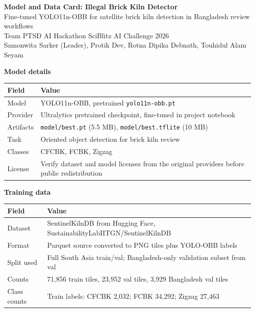\documentclass[9pt]{article}
\begin{document}
\fontsize{8.25}{9.25}\selectfont
\begin{center}
{\large \textbf{Model and Data Card: Illegal Brick Kiln Detector}}\\[-0.2em]
{\small Fine-tuned YOLO11n-OBB for satellite brick kiln detection in Bangladesh review workflows}\\
{\small Team PTSD \textbar{} AI Hackathon SciBlitz AI Challenge 2026}\\
{\small Samonwita Sarker (Leader), Protik Dev, Rotna Dipika Debnath, Touhidul Alam Seyam}
\end{center}
\vspace{-0.25em}

\begin{multicols}{2}
\textbf{Model details}\\[0.05em]
\begin{tabularx}{\linewidth}{@{}lY@{}}
\toprule
Field & Value \\
\midrule
Model & YOLO11n-OBB, pretrained \texttt{yolo11n-obb.pt} \\
Provider & Ultralytics pretrained checkpoint, fine-tuned in project notebook \\
Artifacts & \texttt{model/best.pt} (5.5 MB), \texttt{model/best.tflite} (10 MB) \\
Task & Oriented object detection for brick kiln review \\
Classes & CFCBK, FCBK, Zigzag \\
License & Verify dataset and model licenses from the original providers before public redistribution \\
\bottomrule
\end{tabularx}

\textbf{Training data}\\[0.05em]
\begin{tabularx}{\linewidth}{@{}lY@{}}
\toprule
Field & Value \\
\midrule
Dataset & SentinelKilnDB from Hugging Face, SustainabilityLabIITGN/SentinelKilnDB \\
Format & Parquet source converted to PNG tiles plus YOLO-OBB labels \\
Split used & Full South Asia train/val; Bangladesh-only validation subset from val \\
Counts & 71,856 train tiles, 23,952 val tiles, 3,929 Bangladesh val tiles \\
Class counts & Train labels: CFCBK 2,032; FCBK 34,292; Zigzag 27,463 \\
\bottomrule
\end{tabularx}


\end{multicols}
\end{document}
